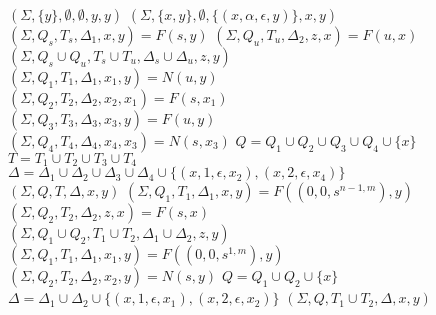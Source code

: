 \documentclass[AMA,STIX1COL]{WileyNJD-v2}
\newcommand{\Xund}{\rule{.4em}{.4pt}}
\begin{document}
\begin{figure*}
\begin{multicols}{2}
\fontsize{8}{10}


    \newcommand \retonfa {F}
    \newcommand \ntag {N}

    \begin{algorithm}[H] \DontPrintSemicolon {}
    \Fn {$\underline{\retonfa(r, y)} \smallskip$} {
         {
            \Return $(\Sigma, \{y\}, \emptyset, \emptyset, y, y)$
        }
        \BlankLine
         {
            \Return $(\Sigma, \{x,y\}, \emptyset, \{(x, \alpha, \epsilon, y)\}, x, y)$
        }
        \BlankLine
         {
            $(\Sigma, Q_s, T_s, \Delta_1, x, y) = \retonfa (s, y)$ \;
            $(\Sigma, Q_u, T_u, \Delta_2, z, x) = \retonfa (u, x)$ \;
            \Return $(\Sigma, Q_s \cup Q_u, T_s \cup T_u, \Delta_s \cup \Delta_u, z, y)$
        }
        \BlankLine
         {
            $(\Sigma, Q_1, T_1, \Delta_1, x_1, y) = \ntag (u, y)$ \;
            $(\Sigma, Q_2, T_2, \Delta_2, x_2, x_1) = \retonfa (s, x_1)$ \;
            $(\Sigma, Q_3, T_3, \Delta_3, x_3, y) = \retonfa (u, y)$ \;
            $(\Sigma, Q_4, T_4, \Delta_4, x_4, x_3) = \ntag (s, x_3)$ \;
            $Q = Q_1 \cup Q_2 \cup Q_3 \cup Q_4 \cup \{x\}$ \;
            $T = T_1 \cup T_2 \cup T_3 \cup T_4$ \;
            $\Delta = \Delta_1 \cup \Delta_2 \cup \Delta_3 \cup \Delta_4 \cup \{(x,1,\epsilon,x_2), (x,2,\epsilon,x_4)\}$ \;
            \Return $(\Sigma, Q, T, \Delta, x, y)$
        }
        \BlankLine
         {
            $(\Sigma, Q_1, T_1, \Delta_1, x, y) = \retonfa ((0, 0, s^{n-1,m}), y)$ \;
            $(\Sigma, Q_2, T_2, \Delta_2, z, x) = \retonfa (s, x)$ \;
            \Return $(\Sigma, Q_1 \cup Q_2, T_1 \cup T_2, \Delta_1 \cup \Delta_2, z, y)$
        }
        \BlankLine
         {
            $(\Sigma, Q_1, T_1, \Delta_1, x_1, y) = \retonfa ((0, 0, s^{1,m}), y)$ \;
            $(\Sigma, Q_2, T_2, \Delta_2, x_2, y) = \ntag (s, y)$ \;
            $Q = Q_1 \cup Q_2 \cup \{x\}$ \;
            $\Delta = \Delta_1 \cup \Delta_2 \cup \{(x,1,\epsilon,x_1), (x,2,\epsilon,x_2)\}$ \;
            \Return $(\Sigma, Q, T_1 \cup T_2, \Delta, x, y)$
}}
\end{algorithm}
\end{multicols}
\end{figure*}
\end{document}
